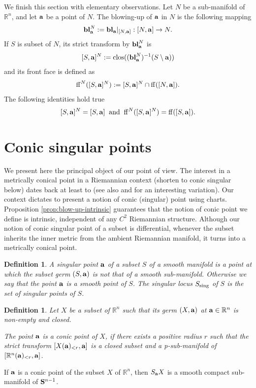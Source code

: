 \documentclass[11pt]{amsart}
\newtheorem{definition}[theorem]{Definition}
\newcommand{\field}[1]{\mathbb{#1}}
\newcommand{\R}{\field{R}}
\newcommand{\ba}{{\bf a}}
\newcommand{\bbl}{{\bf bl}}
\newcommand{\bS}{{\bf S}}
\newcommand{\clos}{{\rm clos}}
\newcommand{\ff}{{\rm ff}}
\newcommand{\Rn}{{\R^n}}
\newcommand{\sing}{{\rm sing}}
\numberwithin{equation}{section}
\numberwithin{equation}{section}
\begin{document}
We finish this section with elementary observations.
Let $N$ be a sub-manifold of $\Rn$, and let $\ba$ be a point of $N$.
The blowing-up of $\ba$ in $N$ is the following mapping
$$
\bbl_\ba^N := \bbl_\ba|_{[N,\ba]} : [N,\ba] \to N.
$$
If $S$ is subset of $N$, its strict transform by $\bbl_\ba^N$ is
$$
[S,\ba]^N := \clos((\bbl_\ba^N)^{-1}(S\setminus \ba))
$$
and its front face is defined as
$$
\ff^N([S,\ba]^N) := [S,\ba]^N \cap \ff([N,\ba]).
$$
The following identities hold true
$$
[S,\ba]^N = [S,\ba] \;\; {\rm and} \;\; \ff^N([S,\ba]^N) = \ff([S,\ba]).
$$


%
%
%

\section{Conic singular points}\label{section:CSP}
%
%
We present here the principal object of our point of view. 
The interest in a metrically conical point in a Riemannian context (shorten to conic singular below) dates back at least to \cite{Che1,ChTa1,ChTa2,Che2} (see also \cite{MeWu} and \cite{Gri} for an interesting variation). Our context dictates to present a notion of conic (singular) point using charts. Proposition \ref{prop:blow-up-intrinsic} guarantees that the notion of conic point
we define is intrinsic, independent of any $C^2$ Riemannian structure. 
 Although our notion of conic singular point of a subset is differential, 
whenever the subset inherits the inner metric from the ambient Riemannian 
manifold, it turns into a metrically conical point. 



%
%

%
%
\begin{definition}
A \em singular point $\ba$ of a subset $S$ \em of a smooth manifold is a point at which the subset germ $(S,\ba)$ is not that of a smooth sub-manifold. Otherwise we say that the point \em $\ba$ is a smooth point \em of $S$. The \em singular locus $S_\sing$ of $S$ \em is the set of singular
points of $S$.
\end{definition}

%
%
\begin{definition}\label{def:conic-point}
	Let $X$ be a subset of $\Rn$ such that its germ $(X,\ba)$ at $\ba \in \Rn$
	is non-empty and closed. 
	
	
	
	The point $\ba$ is \em a conic point of $X$, \em 
	if there  exists a positive radius $r$ such that the strict transform  
	$[X(\ba)_{< r},\ba]$ is a closed subset and a p-sub-manifold of 
	$[\Rn(\ba)_{<r},\ba]$.
	
\end{definition}
%
%
	If $\ba$ is a conic point of the subset $X$ of $\Rn$, then $S_\ba X$ is a 
	smooth compact sub-manifold of $\bS^{n-1}$.  
\end{document}

